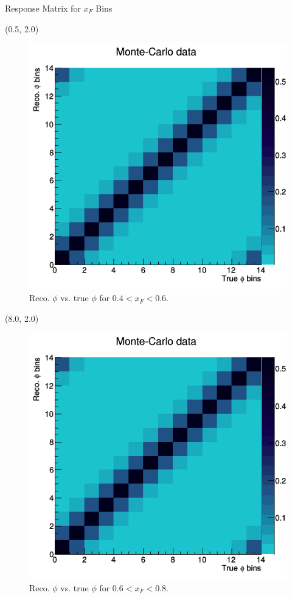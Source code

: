\documentclass[10pt, xcolor={dvipsnames}, aspectratio = 169]{beamer}
\begin{document}
\begin{frame}{Response Matrix for $x_{F}$ Bins}

\begin{textblock}{7.0}(0.5, 2.0)
\begin{figure}
    \centering
    \includegraphics[width = 1.0\linewidth]{imgs/matrix_xf0.png}
    \caption{Reco. $\phi$ vs. true $\phi$ for $0.4 < x_{F} < 0.6$.}
\end{figure}
\end{textblock}

\begin{textblock}{7.0}(8.0, 2.0)
\begin{figure}
    \centering
    \includegraphics[width = 1.0\linewidth]{imgs/matrix_xf1.png}
    \caption{Reco. $\phi$ vs. true $\phi$ for $0.6 < x_{F} < 0.8$.}
\end{figure}
\end{textblock}

\end{frame}
\end{document}
